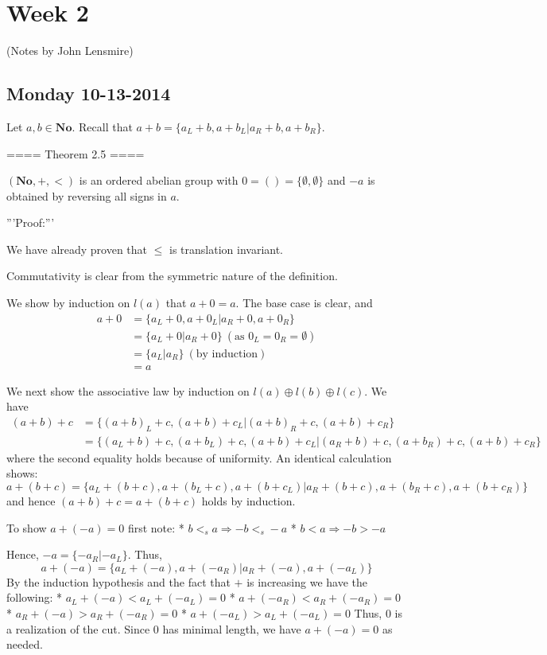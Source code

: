 \section{ Week 2 }

(Notes by John Lensmire)

\subsection{ Monday 10-13-2014 }

Let $a,b\in \mathbf{No}$. Recall that $a + b = \{a_L + b, a + b_L | a_R + b, a + b_R \}$.

==== Theorem 2.5 ====

$(\mathbf{No},+,<)$ is an ordered abelian group with $0 = () = \{\emptyset, \emptyset \}$ and $-a$ is obtained by reversing all signs in $a$.

'''Proof:'''

We have already proven that $\leq$ is translation invariant.

Commutativity is clear from the symmetric nature of the definition.

We show by induction on $l(a)$ that $a+0 = a$. The base case is clear, and
\begin{align*}
a + 0 &= \{a_L + 0, a + 0_L | a_R + 0, a + 0_R \} \\
&= \{a_L + 0 | a_R + 0\} \ (\text{as } 0_L = 0_R = \emptyset) \\
&= \{a_L | a_R\} \ (\text{by induction}) \\
&= a
\end{align*}

We next show the associative law by induction on $l(a)\oplus l(b)\oplus l(c)$.
We have
\begin{align*}
(a+b)+c &= \{(a+b)_L + c, (a+b) + c_L | (a+b)_R + c, (a+b) + c_R \} \\
&= \{(a_L+b) + c, (a+b_L) + c, (a+b) + c_L | (a_R+b) + c, (a+b_R) + c, (a+b) + c_R\}
\end{align*}
where the second equality holds because of uniformity.
An identical calculation shows:
\[
a+(b+c) = \{a_L+ (b + c), a+ (b_L + c), a+ (b + c_L) | a_R+ (b + c), a+ (b_R + c), a+ (b + c_R)\}
\]
and hence $(a+b)+c = a+(b+c)$ holds by induction.

To show $a + (-a) = 0$ first note:
* $b <_s a \Rightarrow -b <_s -a$
* $b < a \Rightarrow -b > -a$

Hence, $-a = \{-a_R | -a_L\}$. Thus,
\[
a + (-a) = \{a_L + (-a), a + (-a_R) | a_R + (-a), a + (-a_L) \}
\]
By the induction hypothesis and the fact that $+$ is increasing we have the following:
* $a_L + (-a) < a_L + (-a_L) = 0$
* $a + (-a_R) < a_R + (-a_R) = 0$
* $a_R + (-a) > a_R + (-a_R) = 0$
* $a + (-a_L) > a_L + (-a_L) = 0$
Thus, $0$ is a realization of the cut. Since $0$ has minimal length, we have $a+(-a) = 0$ as needed.

